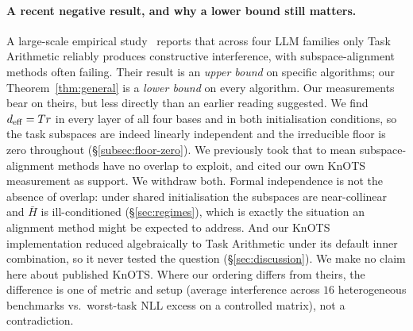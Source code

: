 \paragraph{A recent negative result, and why a lower bound still
matters.} A large-scale empirical study~\citep{systematic2025merging}
reports that across four LLM families only Task Arithmetic reliably
produces constructive interference, with subspace-alignment methods
often failing. Their result is an \emph{upper bound} on specific
algorithms; our Theorem~\ref{thm:general} is a \emph{lower bound} on
every algorithm. Our measurements bear on theirs, but less directly
than an earlier reading suggested. We find $d_{\mathrm{eff}} = Tr$ in every
layer of all four bases and in both initialisation conditions, so the
task subspaces are indeed linearly independent and the irreducible floor
is zero throughout (\S\ref{subsec:floor-zero}). We previously took that
to mean subspace-alignment methods have no overlap to exploit, and cited
our own KnOTS measurement as support. We withdraw both. Formal
independence is not the absence of overlap: under shared initialisation
the subspaces are near-collinear and $\bar H$ is ill-conditioned
(\S\ref{sec:regimes}), which is exactly the situation an alignment
method might be expected to address. And our KnOTS implementation
reduced algebraically to Task Arithmetic under its default inner
combination, so it never tested the question (\S\ref{sec:discussion}).
We make no claim here about published KnOTS. Where our ordering differs
from theirs, the
difference is one of metric and setup (average interference across
$16$ heterogeneous benchmarks vs.\ worst-task NLL excess on a
controlled matrix), not a contradiction.
